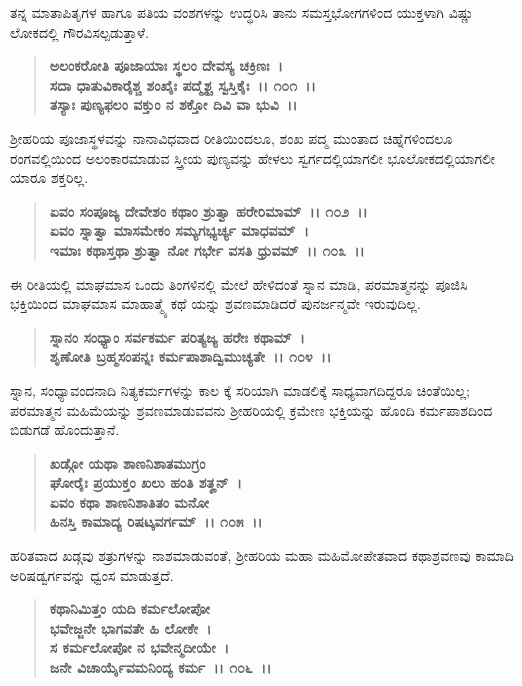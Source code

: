 ತನ್ನ ಮಾತಾಪಿತೃಗಳ ಹಾಗೂ ಪತಿಯ ವಂಶಗಳನ್ನು ಉದ್ಧರಿಸಿ ತಾನು ಸಮಸ್ತಭೋಗಗಳಿಂದ ಯುಕ್ತಳಾಗಿ ವಿಷ್ಣು ಲೋಕದಲ್ಲಿ ಗೌರವಿಸಲ್ಪಡುತ್ತಾಳೆ.

\begin{verse}
\textbf{ಅಲಂಕರೋತಿ ಪೂಜಾಯಾಃ ಸ್ಥಲಂ ದೇವಸ್ಯ ಚಕ್ರಿಣಃ~।}\\\textbf{ಸದಾ ಧಾತುವಿಕಾರೈಶ್ಚ ಶಂಖೈಃ ಪದ್ಮೈಶ್ಚ ಸ್ವಸ್ತಿಕೈಃ~।। ೧೦೧~।।}\\\textbf{ತಸ್ಯಾಃ ಪುಣ್ಯಫಲಂ ವಕ್ತುಂ ನ ಶಕ್ತೋ ದಿವಿ ವಾ ಭುವಿ~।।}
\end{verse}

ಶ‍್ರೀಹರಿಯ ಪೂಜಾಸ್ಥಳವನ್ನು ನಾನಾವಿಧವಾದ ರೀತಿಯಿಂದಲೂ, ಶಂಖ ಪದ್ಮ ಮುಂತಾದ ಚಿಹ್ನೆಗಳಿಂದಲೂ ರಂಗವಲ್ಲಿಯಿಂದ ಅಲಂಕಾರಮಾಡುವ ಸ್ತ್ರೀಯ ಪುಣ್ಯವನ್ನು ಹೇಳಲು ಸ್ವರ್ಗದಲ್ಲಿಯಾಗಲೀ ಭೂಲೋಕದಲ್ಲಿಯಾಗಲೀ ಯಾರೂ ಶಕ್ತರಿಲ್ಲ.

\begin{verse}
\textbf{ಏವಂ ಸಂಪೂಜ್ಯ ದೇವೇಶಂ ಕಥಾಂ ಶ್ರುತ್ವಾ ಹರೇರಿಮಾಮ್~।। ೧೦೨~।।}\\\textbf{ಏವಂ ಸ್ನಾತ್ವಾ ಮಾಸಮೇಕಂ ಸಮ್ಯಗಭ್ಯರ್ಚ್ಯ ಮಾಧವಮ್~।}\\\textbf{ಇಮಾಃ ಕಥಾಸ್ತಥಾ ಶ್ರುತ್ವಾ ನೋ ಗರ್ಭೇ ವಸತಿ ಧ್ರುವಮ್~।। ೧೦೩~।।}
\end{verse}

ಈ ರೀತಿಯಲ್ಲಿ ಮಾಘಮಾಸ ಒಂದು ತಿಂಗಳಿನಲ್ಲಿ ಮೇಲೆ ಹೇಳಿದಂತೆ ಸ್ನಾನ ಮಾಡಿ, ಪರಮಾತ್ಮನನ್ನು ಪೂಜಿಸಿ ಭಕ್ತಿಯಿಂದ ಮಾಘಮಾಸ ಮಾಹಾತ್ಮ್ಯೆ ಕಥೆ ಯನ್ನು ಶ್ರವಣಮಾಡಿದರೆ ಪುನರ್ಜನ್ಮವೇ ಇರುವುದಿಲ್ಲ.

\begin{verse}
\textbf{ಸ್ನಾನಂ ಸಂಧ್ಯಾಂ ಸರ್ವಕರ್ಮ ಪರಿತ್ಯಜ್ಯ ಹರೇಃ ಕಥಾಮ್~।}\\\textbf{ಶೃಣೋತಿ ಬ್ರಹ್ಮಸಂಪನ್ನಃ ಕರ್ಮಪಾಶಾದ್ವಿಮುಚ್ಯತೇ~।। ೧೦೪~।।}
\end{verse}

ಸ್ನಾನ, ಸಂಧ್ಯಾವಂದನಾದಿ ನಿತ್ಯಕರ್ಮಗಳನ್ನು ಕಾಲ ಕ್ಕೆ ಸರಿಯಾಗಿ ಮಾಡಲಿಕ್ಕೆ ಸಾಧ್ಯವಾಗದಿದ್ದರೂ ಚಿಂತೆಯಿಲ್ಲ; ಪರಮಾತ್ಮನ ಮಹಿಮೆಯನ್ನು ಶ್ರವಣಮಾಡುವವನು ಶ‍್ರೀಹರಿಯಲ್ಲಿ ಕ್ರಮೇಣ ಭಕ್ತಿಯನ್ನು ಹೊಂದಿ ಕರ್ಮಪಾಶದಿಂದ ಬಿಡುಗಡೆ ಹೊಂದುತ್ತಾನೆ.

\begin{verse}
\textbf{ಖಡ್ಗೋ ಯಥಾ ಶಾಣನಿಶಾತಮುಗ್ರಂ}\\\textbf{ಘೋರೈಃ ಪ್ರಯುಕ್ತಂ ಖಲು ಹಂತಿ ಶತೄನ್~। }\\\textbf{ಏವಂ ಕಥಾ ಶಾಣನಿಶಾತಿತಂ ಮನೋ} \\\textbf{ಹಿನಸ್ತಿ ಕಾಮಾದ್ಯ ರಿಷಟ್ಕವರ್ಗಮ್~।। ೧೦೫~।।}
\end{verse}

ಹರಿತವಾದ ಖಡ್ಗವು ಶತ್ರುಗಳನ್ನು ನಾಶಮಾಡುವಂತೆ, ಶ‍್ರೀಹರಿಯ ಮಹಾ ಮಹಿಮೋಪೇತವಾದ ಕಥಾಶ್ರವಣವು ಕಾಮಾದಿ ಅರಿಷಡ್ವರ್ಗವನ್ನು ಧ್ವಂಸ ಮಾಡುತ್ತದೆ.

\begin{verse}
\textbf{ಕಥಾನಿಮಿತ್ತಂ ಯದಿ ಕರ್ಮಲೋಪೋ}\\\textbf{ಭವೇಜ್ಜನೇ ಭಾಗವತೇ ಹಿ ಲೋಕೇ~। }\\\textbf{ಸ ಕರ್ಮಲೋಪೋ ನ ಭವೇನ್ಮದೀಯೇ~।} \\\textbf{ಜನೇ ವಿಚಾರ್ಯೈವಮನಿಂದ್ಯ ಕರ್ಮ~।। ೧೦೬~।।}
\end{verse}

